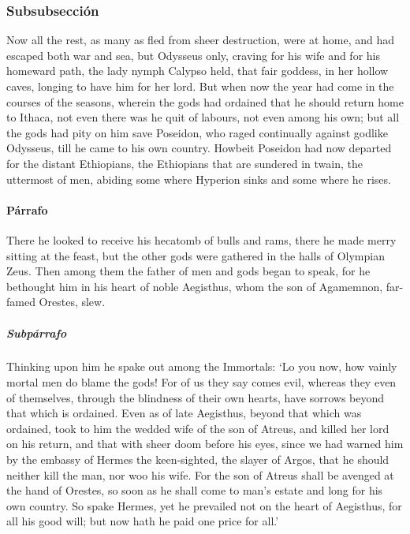 \documentclass[12pt,letter]{article}
\begin{document}
\subsubsection{Subsubsección}
    \noindent Now all the rest, as many as fled from sheer destruction, were at
    home, and had escaped both war and sea, but Odysseus only, craving
    for his wife and for his homeward path, the lady nymph Calypso
    held, that fair goddess, in her hollow caves, longing to have him
    for her lord. But when now the year had come in the courses of the
    seasons, wherein the gods had ordained that he should return home
    to Ithaca, not even there was he quit of labours, not even among
    his own; but all the gods had pity on him save Poseidon, who raged
    continually against godlike Odysseus, till he came to his own
    country. Howbeit Poseidon had now departed for the distant
    Ethiopians, the Ethiopians that are sundered in twain, the
    uttermost of men, abiding some where Hyperion sinks and some where
    he rises.

    \paragraph{Párrafo}
    There he looked to receive his hecatomb of bulls and
    rams, there he made merry sitting at the feast, but the other gods
    were gathered in the halls of Olympian Zeus. Then among them the
    father of men and gods began to speak, for he bethought him in his
    heart of noble Aegisthus, whom the son of Agamemnon, far-famed
    Orestes, slew.
    
    \subparagraph{Subpárrafo} Thinking upon him he spake out among the Immortals:
    ‘Lo you now, how vainly mortal men do blame the gods! For of us
    they say comes evil, whereas they even of themselves, through the
    blindness of their own hearts, have sorrows beyond that which is
    ordained. Even as of late Aegisthus, beyond that which was
    ordained, took to him the wedded wife of the son of Atreus, and
    killed her lord on his return, and that with sheer doom before his
    eyes, since we had warned him by the embassy of Hermes the
    keen-sighted, the slayer of Argos, that he should neither kill the
    man, nor woo his wife. For the son of Atreus shall be avenged at
    the hand of Orestes, so soon as he shall come to man’s estate and
    long for his own country. So spake Hermes, yet he prevailed not on
    the heart of Aegisthus, for all his good will; but now hath he paid
    one price for all.’
\end{document}
